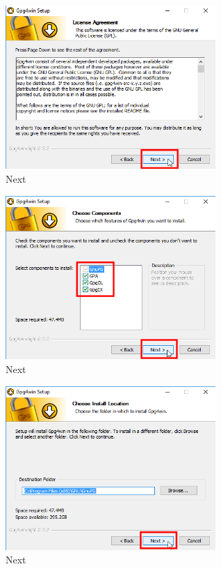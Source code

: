 \documentclass[a4paper,11pt]{article}
\begin{document}
\newpage
\begin{figure}[!h]
	\begin{center}
		\includegraphics[width=8cm]{08_Gpg4win_Setup.png}
		\caption{Next}
		\label{initialscreen}
	\end{center}
\end{figure}
\begin{figure}[!h]
	\begin{center}
		\includegraphics[width=8cm]{09_Gpg4win_Setup.png}
		\caption{Next}
		\label{initialscreen}
	\end{center}
\end{figure}
\newpage
\begin{figure}[!h]
	\begin{center}
		\includegraphics[width=8cm]{10_Gpg4win_Setup.png}
		\caption{Next}
		\label{initialscreen}
	\end{center}
\end{figure}
\end{document}
